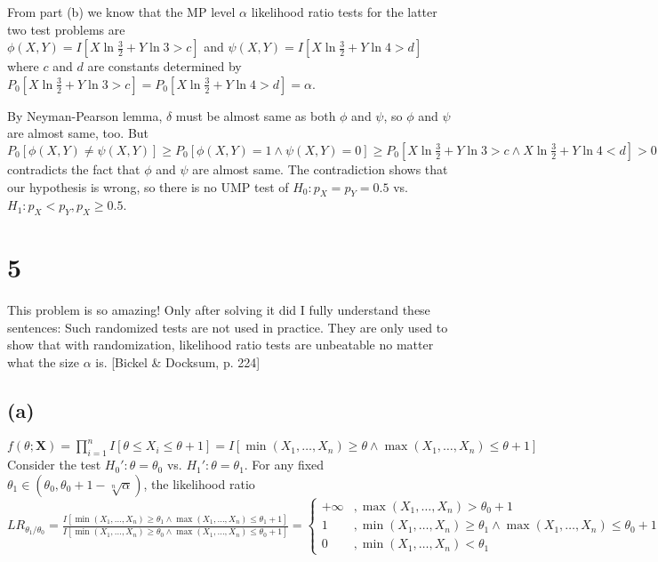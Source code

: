 From part (b) we know that the MP level $\alpha$ likelihood ratio tests for the latter two test problems are \\
$
\phi(X, Y) = I[X\ln\frac{3}{2}+Y\ln3 > c]
$
and
$
\psi(X, Y) = I[X\ln\frac{3}{2}+Y\ln4 > d]
$
where $c$ and $d$ are constants determined by
$
P_0[X\ln\frac{3}{2}+Y\ln3 > c]
=
P_0[X\ln\frac{3}{2}+Y\ln4 > d]
=\alpha
$.

By Neyman-Pearson lemma, $\delta$ must be almost same as both $\phi$ and $\psi$, so $\phi$ and $\psi$ are almost same, too. But\\
$
P_0[\phi(X, Y) \neq \psi(X, Y)]
\geq
P_0[\phi(X, Y)=1 \wedge \psi(X, Y) = 0]
\geq
P_0[ X\ln\frac{3}{2}+Y\ln3 > c \wedge X\ln\frac{3}{2}+Y\ln4 < d]
>0
$
\\
contradicts the fact that $\phi$ and $\psi$ are almost same. The contradiction shows that our hypothesis is wrong, so there is no UMP test of $H_0: p_X=p_Y=0.5$ vs. $H_1: p_X<p_Y, p_X \geq 0.5$.

\section*{5}
This problem is so amazing! Only after solving it did I fully understand these sentences: Such randomized tests are not used in practice. They are only used to show that with randomization, likelihood ratio tests are unbeatable no matter what the size $\alpha$ is. [Bickel \& Docksum, p. 224]
\subsection*{(a)}
$
f(\theta; \mathbf{X}) =
\prod_{i=1}^{n} I[\theta \leq X_i \leq \theta+1] =
I[\min(X_1, \dots, X_n) \geq \theta \wedge \max(X_1, \dots, X_n) \leq \theta+1]
$
\\
Consider the test $H_0': \theta=\theta_0$ vs. $H_1': \theta=\theta_1$.
For any fixed $\theta_1 \in (\theta_0, \theta_0+1-\sqrt[n]{\alpha})$, the likelihood ratio \\
$
LR_{\theta_1/\theta_0} =
\frac{
I[\min(X_1, \dots, X_n) \geq \theta_1 \wedge \max(X_1, \dots, X_n) \leq \theta_1+1]
}
{
I[\min(X_1, \dots, X_n) \geq \theta_0 \wedge \max(X_1, \dots, X_n) \leq \theta_0+1]
} =
\left\{\begin{array}{cl}
+\infty & , \max(X_1, \dots, X_n) > \theta_0+1
\\
1 & , \min(X_1, \dots, X_n) \geq \theta_1 \wedge \max(X_1, \dots, X_n) \leq \theta_0+1
\\
0 & , \min(X_1, \dots, X_n) < \theta_1
\end{array}\right.
$

